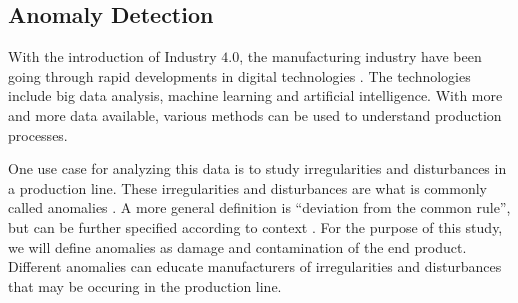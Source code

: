 \subsection{Anomaly Detection}

With the introduction of Industry $4.0$, the manufacturing industry have been going through rapid developments in digital technologies \cite{industry4}. The technologies include big data analysis, machine learning and artificial intelligence. With more and more data available, various methods can be used to understand production processes. 
\par
One use case for analyzing this data is to study irregularities and disturbances in a production line. These irregularities and disturbances are what is commonly called anomalies \cite{AnomalyDef}. A more general definition is ``deviation from the common rule'', but can be further specified according to context \cite{dictionary}. For the purpose of this study, we will define anomalies as damage and contamination of the end product. Different anomalies can educate manufacturers of irregularities and disturbances that may be occuring in the production line. 
\par
